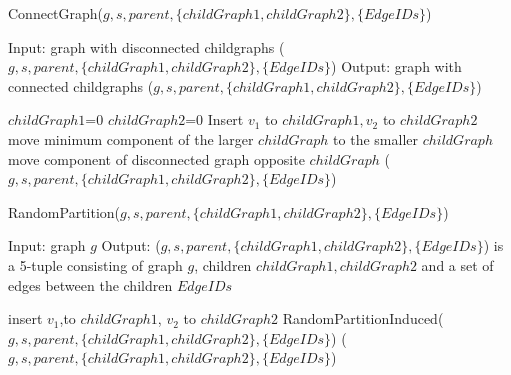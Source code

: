 \begin{algorithm}
\caption{ConnectGraph($g,s,parent,\{childGraph1,childGraph2\},\{EdgeIDs\}$)}
\label{alg:alg103}
\begin{algorithmic}
\STATE Input: graph with disconnected childgraphs ($g,s,parent,\{childGraph1,childGraph2\},\{EdgeIDs\}$)
\STATE Output: graph with connected childgraphs ($g,s,parent,\{childGraph1,childGraph2\},\{EdgeIDs\}$)
\end{algorithmic}
\begin{algorithmic}[1]
\STATE $childGraph1$=0
\STATE $childGraph2$=0
   \STATE Insert $v_{1}$ to $childGraph1, v_{2}$ to $childGraph2$
\ELSE 
    \STATE move minimum component of the larger $childGraph$ to the smaller $childGraph$ 
  \ELSE
    \STATE move component of disconnected graph opposite $childGraph$
  \ENDIF
 \ENDWHILE
\ENDIF
\RETURN ($g,s,parent,\{childGraph1,childGraph2\},\{EdgeIDs\}$)
\end{algorithmic}
\end{algorithm}


\begin{algorithm}
\caption{RandomPartition($g,s,parent,\{childGraph1,childGraph2\},\{EdgeIDs\}$)}
\label{alg:alg104}
\begin{algorithmic}
\STATE Input: graph $g$
\STATE Output: ($g,s,parent,\{childGraph1,childGraph2\},\{EdgeIDs\}$) is a 5-tuple consisting of graph $g$, children  $childGraph1,childGraph2 $ and a set of edges between the children $EdgeIDs$ 
\end{algorithmic}
\begin{algorithmic}[1]
    \STATE insert $v_1$,to $childGraph1$, $v_2$ to $childGraph2$    
 \ELSE
   \STATE RandomPartitionInduced($g,s,parent,\{childGraph1,childGraph2\},\{EdgeIDs\}$)
\ENDIF
\RETURN ($g,s,parent,\{childGraph1,childGraph2\},\{EdgeIDs\}$)
\end{algorithmic}
\end{algorithm}


